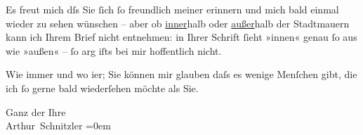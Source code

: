\pstart
           Es freut mich dſs Sie{ }ſich{ }ſo freundlich meiner erinnern und mich bald einmal wieder
               zu sehen wünschen – aber ob \uline{inner}halb oder \uline{außer}halb der Stadtmauern kann ich Ihrem Brief nicht
               entnehmen: in Ihrer Schrift{ }ſieht {\pb}»innen«
               genau{ }ſo aus wie »außen« –{ }ſo arg iſts bei mir hoffentlich nicht.\pend
           
\pstart
           Wie immer und wo i{\geminationm}er; Sie können mir glauben daſs es
               wenige Menſchen gibt, die ich{ }ſo gerne bald wiederſehen möchte als Sie.\pend
           
\pstart
           Ganz der Ihre{\\[\baselineskip]}\spacefill\mbox{Arthur Schnitzler}\pend
           \leftskip=0em{}\endnumbering{}  \newcommand{\dateiname}{L00964}\newcommand{\titel}{Arthur Schnitzler an Gerhart Hauptmann, 25. 8. 1899}\newcommand{\editorInnen}{Herausgegeben von Martin Anton Müller}
